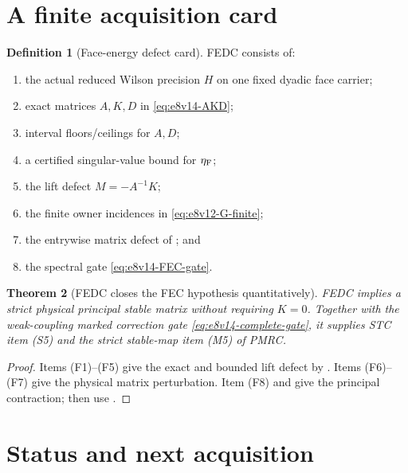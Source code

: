 \documentclass[11pt,oneside]{book}
\newtheorem{theorem}{Theorem}[chapter]
\theoremstyle{definition}
\newtheorem{definition}[theorem]{Definition}
\theoremstyle{remark}
\begin{document}
\section{A finite acquisition card}
\label{sec:e8v14-card}

\begin{definition}[Face-energy defect card]
\label{def:e8v14-card}
FEDC consists of:
\begin{enumerate}[label=\textup{(F\arabic*)},leftmargin=4em]
\item the actual reduced Wilson precision \(H\) on one fixed dyadic
      face carrier;
\item exact matrices \(A,K,D\) in
      \eqref{eq:e8v14-AKD};
\item interval floors/ceilings for \(A,D\);
\item a certified singular-value bound for \(\eta_{\rm F}\);
\item the lift defect \(M=-A^{-1}K\);
\item the finite owner incidences in
      \eqref{eq:e8v12-G-finite};
\item the entrywise matrix defect of
      ; and
\item the spectral gate
      \eqref{eq:e8v14-FEC-gate}.
\end{enumerate}
\end{definition}

\begin{theorem}[FEDC closes the FEC hypothesis quantitatively]
\label{thm:e8v14-card}
FEDC implies a strict physical principal stable matrix without
requiring \(K=0\).  Together with the weak-coupling marked correction
gate \eqref{eq:e8v14-complete-gate}, it supplies STC item (S5) and the
strict stable-map item (M5) of PMRC.
\end{theorem}

\begin{proof}
Items (F1)--(F5) give the exact and bounded lift defect by
.  Items (F6)--(F7) give the
physical matrix perturbation.  Item (F8) and
 give the principal contraction; then use
.
\end{proof}

\section{Status and next acquisition}
\label{sec:e8v14-status}
\end{document}
